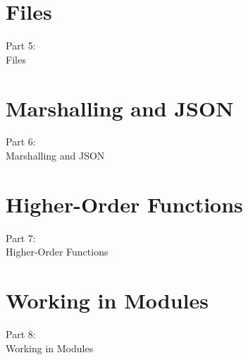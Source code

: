 
\section{Files}
\begin{frame}
    \vspace{25mm}
    \begin{center}
        \Huge{Part 5:\\Files}
    \end{center}
\end{frame}


\section{Marshalling and JSON}
\begin{frame}
    \vspace{25mm}
    \begin{center}
        \Huge{Part 6:\\Marshalling and JSON}
    \end{center}
\end{frame}


\section{Higher-Order Functions}
\begin{frame}
    \vspace{25mm}
    \begin{center}
        \Huge{Part 7:\\Higher-Order Functions}
    \end{center}
\end{frame}


\section{Working in Modules}
\begin{frame}
    \vspace{25mm}
    \begin{center}
        \Huge{Part 8:\\Working in Modules}
    \end{center}
\end{frame}

